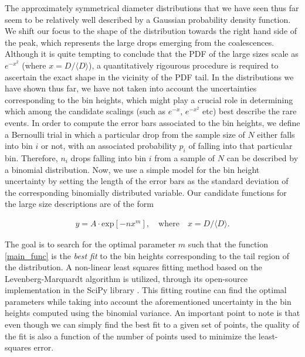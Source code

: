The approximately symmetrical diameter distributions that we have seen 
thus far seem to be relatively well described by a Gaussian probability density function. 
We shift our focus to the shape of the distribution towards the right hand 
side of the peak, which represents the large drops emerging from the coalescences.
Although it is quite tempting to conclude that the PDF of the large sizes 
scale as $e^{-x^{2}}$ (where $x = D/\langle D \rangle$), a quantitatively rigourous
procedure is required to ascertain the exact shape in the vicinity of the PDF tail.
In the distributions we have shown thus far, we have not taken into account the 
uncertainties corresponding to the bin heights, which might play a crucial role in determining which among
the candidate scalings (such as $ e^{-x}$, $e^{-x^{2}}$ etc) best describe the rare events. 
In order to compute the error bars associated to the bin heights, we define 
a Bernoulli trial in which a particular drop from the sample size of $N$ either falls into
bin $i$ or not, with an associated probability $p_i$ of falling into that particular bin.
Therefore, $n_i$ drops falling into bin $i$ from a sample of $N$ can be described by a binomial distribution. 
Now, we use a simple model for the bin height uncertainty by setting the length 
of the error bars as the standard deviation 
of the corresponding binomially distributed variable. 
Our candidate functions for the large size descriptions are of the form 

\begin{align}
	y = A \cdot \textrm{exp}\left[-n x^m\right] , \quad \text{where} \quad x = D/\langle D \rangle . 
\label{main_func}
\end{align}

The goal is to search for the optimal parameter $m$ such that the function \eqref{main_func} 
is the \textit{best fit} to the bin heights corresponding to the tail region of the distribution.
A non-linear least squares fitting method based on the Levenberg-Marquardt algorithm 
is utilized, through its open-source implementation in the SciPy library \cite{scipy}. 
This fitting routine can find the optimal parameters while taking into account the 
aforementioned uncertainty in the bin heights computed using the binomial variance. 
An important point to note is that even though we can simply find the best fit
to a given set of points, the quality of the fit is also a function
of the number of points used to minimize the least-squares error. 

